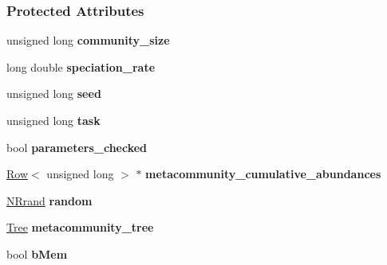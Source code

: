 \subsubsection*{Protected Attributes}
\begin{DoxyCompactItemize}
\item 
unsigned long {\bfseries community\+\_\+size}\hypertarget{group___community_objects_a3b392090e764ffb2ada3881e4eddd0b1}{}\label{group___community_objects_a3b392090e764ffb2ada3881e4eddd0b1}

\item 
long double {\bfseries speciation\+\_\+rate}\hypertarget{group___community_objects_aad4378b40264345fc6f5116aedc58c26}{}\label{group___community_objects_aad4378b40264345fc6f5116aedc58c26}

\item 
unsigned long {\bfseries seed}\hypertarget{group___community_objects_afd81750697ac8540b71de001ee53fc61}{}\label{group___community_objects_afd81750697ac8540b71de001ee53fc61}

\item 
unsigned long {\bfseries task}\hypertarget{group___community_objects_a094dfd2d0bb737a1f5bd06ceb3c6da1f}{}\label{group___community_objects_a094dfd2d0bb737a1f5bd06ceb3c6da1f}

\item 
bool {\bfseries parameters\+\_\+checked}\hypertarget{group___community_objects_a8b0ca689c1c638e49424d59fadb2e28d}{}\label{group___community_objects_a8b0ca689c1c638e49424d59fadb2e28d}

\item 
\hyperlink{class_row}{Row}$<$ unsigned long $>$ $\ast$ {\bfseries metacommunity\+\_\+cumulative\+\_\+abundances}\hypertarget{group___community_objects_ae9ef6b36732d3269baef697b5341c0b9}{}\label{group___community_objects_ae9ef6b36732d3269baef697b5341c0b9}

\item 
\hyperlink{class_n_rrand}{N\+Rrand} {\bfseries random}\hypertarget{group___community_objects_aa47b2ff3f6944143f8e734d0988d2ff3}{}\label{group___community_objects_aa47b2ff3f6944143f8e734d0988d2ff3}

\item 
\hyperlink{class_tree}{Tree} {\bfseries metacommunity\+\_\+tree}\hypertarget{group___community_objects_a85e91103025feb641bf0df9d02152b99}{}\label{group___community_objects_a85e91103025feb641bf0df9d02152b99}

\item 
bool {\bfseries b\+Mem}\hypertarget{group___community_objects_ad5344789223153c3756dbad28948410b}{}\label{group___community_objects_ad5344789223153c3756dbad28948410b}


\end{DoxyCompactItemize}
